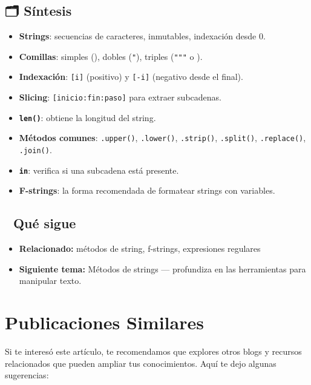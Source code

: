 \documentclass[
  doc,
  floatsintext,
  longtable,
  a4paper,
  nolmodern,
  notxfonts,
  notimes,
  12pt,
  colorlinks=true,linkcolor=blue,citecolor=blue,urlcolor=blue]{apa7}
\providecommand{\tightlist}{%
  \setlength{\itemsep}{0pt}\setlength{\parskip}{0pt}}
\begin{document}
\subsection{🗂️ Síntesis}\label{suxedntesis}

\begin{itemize}
\tightlist
\item
  \textbf{Strings}: secuencias de caracteres, inmutables, indexación
  desde 0.
\item
  \textbf{Comillas}: simples (\texttt{\textquotesingle{}}), dobles
  (\texttt{"}), triples (\texttt{"""} o
  \texttt{\textquotesingle{}\textquotesingle{}\textquotesingle{}}).
\item
  \textbf{Indexación}: \texttt{{[}i{]}} (positivo) y \texttt{{[}-i{]}}
  (negativo desde el final).
\item
  \textbf{Slicing}: \texttt{{[}inicio:fin:paso{]}} para extraer
  subcadenas.
\item
  \textbf{\texttt{len()}}: obtiene la longitud del string.
\item
  \textbf{Métodos comunes}: \texttt{.upper()}, \texttt{.lower()},
  \texttt{.strip()}, \texttt{.split()}, \texttt{.replace()},
  \texttt{.join()}.
\item
  \textbf{\texttt{in}}: verifica si una subcadena está presente.
\item
  \textbf{F-strings}: la forma recomendada de formatear strings con
  variables.
\end{itemize}

\subsection{🔗 Qué sigue}\label{quuxe9-sigue}

\begin{itemize}
\tightlist
\item
  \textbf{Relacionado:} métodos de string, f-strings, expresiones
  regulares
\item
  \textbf{Siguiente tema:} Métodos de strings --- profundiza en las
  herramientas para manipular texto.
\end{itemize}

\section{Publicaciones Similares}\label{publicaciones-similares}

Si te interesó este artículo, te recomendamos que explores otros blogs y
recursos relacionados que pueden ampliar tus conocimientos. Aquí te dejo
algunas sugerencias:
\end{document}
